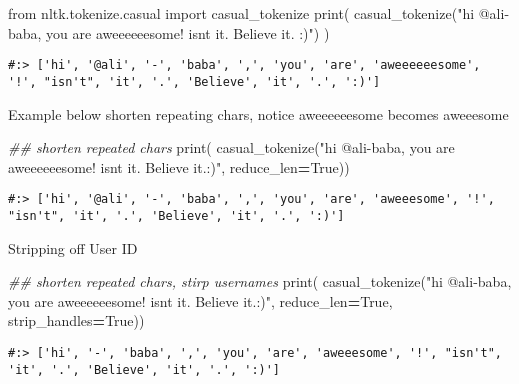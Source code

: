 \documentclass[
]{book}
\newenvironment{Shaded}{\begin{snugshade}}{\end{snugshade}}
\newcommand{\BuiltInTok}[1]{#1}
\newcommand{\CommentTok}[1]{\textcolor[rgb]{0.37,0.37,0.37}{\textit{#1}}}
\newcommand{\ImportTok}[1]{#1}
\newcommand{\NormalTok}[1]{#1}
\newcommand{\OperatorTok}[1]{\textcolor[rgb]{0.43,0.43,0.43}{\textbf{#1}}}
\newcommand{\StringTok}[1]{\textcolor[rgb]{0.5,0.5,0.5}{#1}}
\newcommand{\VariableTok}[1]{\textcolor[rgb]{0,0,0}{#1}}
\begin{document}
\begin{Shaded}
\begin{Highlighting}[]
\ImportTok{from}\NormalTok{ nltk.tokenize.casual     }\ImportTok{import}\NormalTok{ casual\_tokenize}
\BuiltInTok{print}\NormalTok{( casual\_tokenize(}\StringTok{"hi @ali{-}baba, you are aweeeeeesome! isn\textquotesingle{}t it. Believe it. :)"}\NormalTok{) )  }
\end{Highlighting}
\end{Shaded}

\begin{verbatim}
#:> ['hi', '@ali', '-', 'baba', ',', 'you', 'are', 'aweeeeeesome', '!', "isn't", 'it', '.', 'Believe', 'it', '.', ':)']
\end{verbatim}

Example below shorten repeating chars, notice aweeeeeesome becomes aweeesome

\begin{Shaded}
\begin{Highlighting}[]
\CommentTok{\#\# shorten repeated chars}
\BuiltInTok{print}\NormalTok{( casual\_tokenize(}\StringTok{"hi @ali{-}baba, you are aweeeeeesome! isn\textquotesingle{}t it. Believe it.:)"}\NormalTok{, }
\NormalTok{          reduce\_len}\OperatorTok{=}\VariableTok{True}\NormalTok{))     }
\end{Highlighting}
\end{Shaded}

\begin{verbatim}
#:> ['hi', '@ali', '-', 'baba', ',', 'you', 'are', 'aweeesome', '!', "isn't", 'it', '.', 'Believe', 'it', '.', ':)']
\end{verbatim}

Stripping off User ID

\begin{Shaded}
\begin{Highlighting}[]
\CommentTok{\#\# shorten repeated chars, stirp usernames}
\BuiltInTok{print}\NormalTok{( casual\_tokenize(}\StringTok{"hi @ali{-}baba, you are aweeeeeesome! isn\textquotesingle{}t it. Believe it.:)"}\NormalTok{, }
\NormalTok{          reduce\_len}\OperatorTok{=}\VariableTok{True}\NormalTok{,      }
\NormalTok{          strip\_handles}\OperatorTok{=}\VariableTok{True}\NormalTok{))  }
\end{Highlighting}
\end{Shaded}

\begin{verbatim}
#:> ['hi', '-', 'baba', ',', 'you', 'are', 'aweeesome', '!', "isn't", 'it', '.', 'Believe', 'it', '.', ':)']
\end{verbatim}
\end{document}
